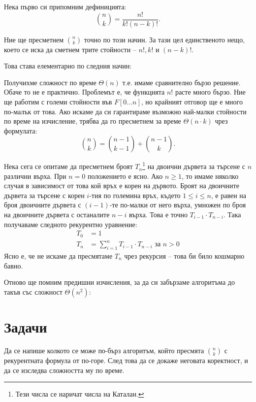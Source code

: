 Нека първо си припомним дефиницията:
\[
    {n \choose k} = \frac{n!}{k! (n - k)!}.
\]

Ние ще пресметнем ${n \choose k}$ точно по този начин.
За тази цел единственото нещо, което се иска да сметнем трите стойности -- $n!, k!$ и $(n - k)!$.

\newpage

Това става елементарно по следния начин:

Получихме сложност по време $\Theta(n)$ т.е. имаме сравнително бързо решение.
Обаче то не е практично.
Проблемът е, че функцията $n!$ расте много бързо.
Ние ще работим с големи стойности във $F[0 \dots n]$, но крайният отговор ще е много по-малък от това.
Ако искаме да си гарантираме възможно най-малки стойности по време на изчисление, трябва да го пресметнем за време $\Theta(n \cdot k)$ чрез формулата:
\[
    {n \choose k} = {n - 1 \choose k - 1} + {n - 1 \choose k}.
\]

Нека сега се опитаме да пресметнем броят $T_n$\footnote{Тези числа се наричат числа на Каталан.} на двоични дървета за търсене с $n$ различни върха.
При $n = 0$ положението е ясно.
Ако $n \geq 1$, то имаме няколко случая в зависимост от това кой връх е корен на дървото.
Броят на двоичните дървета за търсене с корен $i$-тия по големина връх, където $1 \leq i \leq n$, е равен на броя двоичните дървета с $(i - 1)$-те по-малки от него върха, умножен по броя на двоичните дървета с останалите $n - i$ върха.
Това е точно $T_{i - 1} \cdot T_{n - i}$.
Така получаваме следното рекурентно уравнение:
\begin{align*}
    T_0 & = 1                                                                 \\
    T_n & = \sum\limits_{i = 1}^n T_{i - 1} \cdot T_{n - i} \text{ за } n > 0
\end{align*}
Ясно е, че не искаме да пресмятаме $T_n$ чрез рекурсия -- това би било кошмарно бавно.

\newpage

Отново ще помним предишни изчисления, за да си забързаме алгоритъма до такъв със сложност $\Theta(n^2)$:


\section{Задачи}

\begin{problem}
Да се напише колкото се може по-бърз алгоритъм, който пресмята ${n \choose k}$ с рекурентната формула от по-горе.
След това да се докаже неговата коректност, и да се изследва сложността му по време.
\end{problem}

